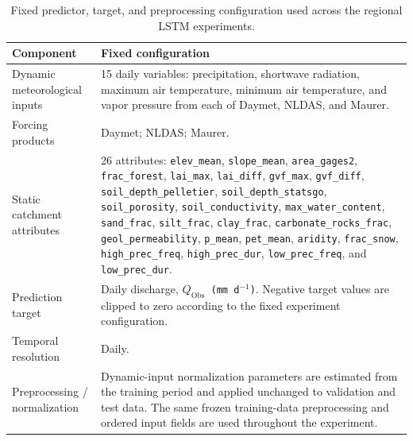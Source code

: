 \begin{table}[htbp]
\centering
\caption{Fixed predictor, target, and preprocessing configuration used across
the regional LSTM experiments.}
\label{tab:fixed_inputs}
\small
\renewcommand{\arraystretch}{1.12}
\setlength{\tabcolsep}{5pt}

\begin{tabular}{p{} p{}}
\toprule
Component & Fixed configuration \\
\midrule

Dynamic meteorological inputs &
15 daily variables: precipitation, shortwave radiation, maximum air
temperature, minimum air temperature, and vapor pressure from each of
Daymet, NLDAS, and Maurer. \\

Forcing products &
Daymet; NLDAS; Maurer. \\

Static catchment attributes &
26 attributes:
\texttt{elev\_mean}, \texttt{slope\_mean}, \texttt{area\_gages2},
\texttt{frac\_forest}, \texttt{lai\_max}, \texttt{lai\_diff},
\texttt{gvf\_max}, \texttt{gvf\_diff},
\texttt{soil\_depth\_pelletier}, \texttt{soil\_depth\_statsgo},
\texttt{soil\_porosity}, \texttt{soil\_conductivity},
\texttt{max\_water\_content}, \texttt{sand\_frac},
\texttt{silt\_frac}, \texttt{clay\_frac},
\texttt{carbonate\_rocks\_frac}, \texttt{geol\_permeability},
\texttt{p\_mean}, \texttt{pet\_mean}, \texttt{aridity},
\texttt{frac\_snow}, \texttt{high\_prec\_freq},
\texttt{high\_prec\_dur}, \texttt{low\_prec\_freq},
and \texttt{low\_prec\_dur}. \\

Prediction target &
Daily discharge, \texttt{$Q_{\mathrm{Obs}}$ (mm d$^{-1}$)}. Negative target values are clipped to
zero according to the fixed experiment configuration. \\

Temporal resolution &
Daily. \\

Preprocessing / normalization &
Dynamic-input normalization parameters are estimated from the training period
and applied unchanged to validation and test data. The same frozen training-data
preprocessing and ordered input fields are used throughout the experiment. \\

\bottomrule
\end{tabular}
\end{table}
